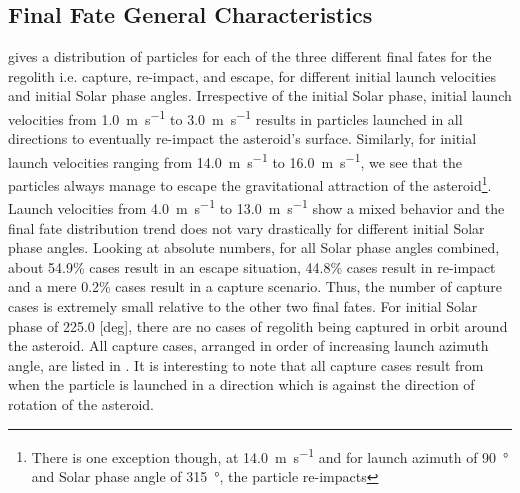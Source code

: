 \subsection{Final Fate General Characteristics}
\label{subsec:final_fate_charac_general}
 gives a distribution of particles for each of the three different final fates for the regolith i.e. capture, re-impact, and escape, for different initial launch velocities and initial Solar phase angles. Irrespective of the initial Solar phase, initial launch velocities from \SI{1.0}{\metre\per\second} to \SI{3.0}{\metre\per\second} results in particles launched in all directions to eventually re-impact the asteroid's surface. Similarly, for initial launch velocities ranging from \SI{14.0}{\metre\per\second} to \SI{16.0}{\metre\per\second}, we see that the particles always manage to escape the gravitational attraction of the asteroid\footnote{There is one exception though, at \SI{14.0}{\metre\per\second} and for launch azimuth of \SI{90}{\degree} and Solar phase angle of \SI{315}{\degree}, the particle re-impacts}. Launch velocities from \SI{4.0}{\metre\per\second} to \SI{13.0}{\metre\per\second} show a mixed behavior and the final fate distribution trend does not vary drastically for different initial Solar phase angles. Looking at absolute numbers, for all Solar phase angles combined, about 54.9\% cases result in an escape situation, 44.8\% cases result in re-impact and a mere 0.2\% cases result in a capture scenario. Thus, the number of capture cases is extremely small relative to the other two final fates.
%
\newline\newline
%
For initial Solar phase of 225.0 [deg], there are no cases of regolith being captured in orbit around the asteroid. All capture cases, arranged in order of increasing launch azimuth angle, are listed in . It is interesting to note that all capture cases result from when the particle is launched in a direction which is against the direction of rotation of the asteroid.

